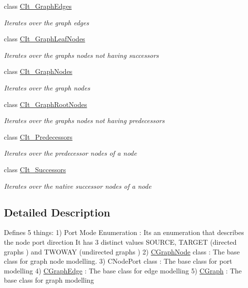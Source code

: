 \begin{DoxyCompactItemize}
class \hyperlink{class_graph_library_1_1_c_it___graph_edges}{C\+It\+\_\+\+Graph\+Edges}
\begin{DoxyCompactList}\small\item\em Iterates over the graph edges \end{DoxyCompactList}\item 
class \hyperlink{class_graph_library_1_1_c_it___graph_leaf_nodes}{C\+It\+\_\+\+Graph\+Leaf\+Nodes}
\begin{DoxyCompactList}\small\item\em Iterates over the graph\textquotesingle{}s nodes not having successors \end{DoxyCompactList}\item 
class \hyperlink{class_graph_library_1_1_c_it___graph_nodes}{C\+It\+\_\+\+Graph\+Nodes}
\begin{DoxyCompactList}\small\item\em Iterates over the graph nodes \end{DoxyCompactList}\item 
class \hyperlink{class_graph_library_1_1_c_it___graph_root_nodes}{C\+It\+\_\+\+Graph\+Root\+Nodes}
\begin{DoxyCompactList}\small\item\em Iterates over the graph\textquotesingle{}s nodes not having predecessors \end{DoxyCompactList}\item 
class \hyperlink{class_graph_library_1_1_c_it___predecessors}{C\+It\+\_\+\+Predecessors}
\begin{DoxyCompactList}\small\item\em Iterates over the predecessor nodes of a node \end{DoxyCompactList}\item 
class \hyperlink{class_graph_library_1_1_c_it___successors}{C\+It\+\_\+\+Successors}
\begin{DoxyCompactList}\small\item\em Iterates over the native successor nodes of a node \end{DoxyCompactList}\end{DoxyCompactItemize}


\subsection{Detailed Description}
Defines 5 things\+: 1) Port Mode Enumeration \+: Its an enumeration that describes the node port direction It has 3 distinct values S\+O\+U\+R\+C\+E, T\+A\+R\+G\+E\+T (directed graphs ) and T\+W\+O\+W\+A\+Y (undirected graphs ) 2) \hyperlink{class_graph_library_1_1_c_graph_node}{C\+Graph\+Node} class \+: The base class for graph node modelling. 3) C\+Node\+Port class \+: The base class for port modelling 4) \hyperlink{class_graph_library_1_1_c_graph_edge}{C\+Graph\+Edge} \+: The base class for edge modelling 5) \hyperlink{class_graph_library_1_1_c_graph}{C\+Graph} \+: The base class for graph modelling 

